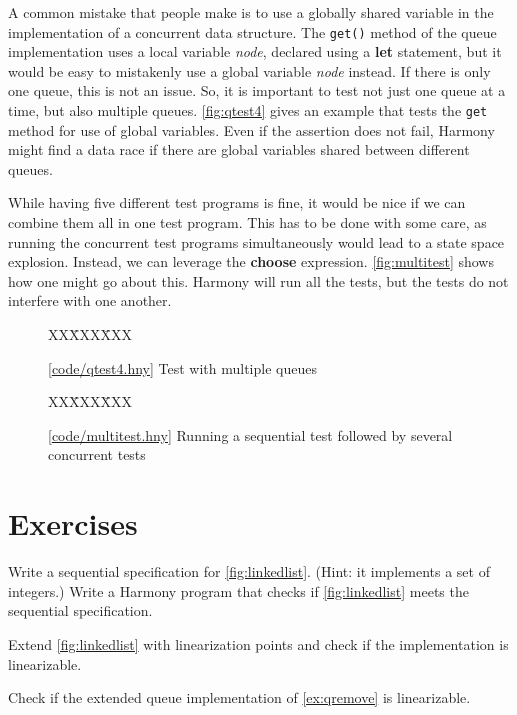 \documentclass{report}
\newcommand{\harmonysource}[1]{
\begin{tabbing}
XX\=XXX\=XXX\kill
    
\end{tabbing}
}
\newcommand{\harmonylink}[1]{%
[\href{https://harmony.cs.cornell.edu/#1}{\underline{#1}}]%
}
\newenvironment{code}{
\tcolorbox
}{
\endtcolorbox
}
\begin{document}
A common mistake that people make is to use
a globally shared variable in the implementation of
a concurrent data structure.
The \texttt{get()} method of the queue implementation
uses a local variable \textit{node}, declared using
a \textbf{let} statement, but it would be easy to
mistakenly use a global variable \textit{node} instead.
If there is only one queue, this is not an issue.
So, it is important to test not just one queue at a
time, but also multiple queues.
\autoref{fig:qtest4} gives an example that
tests the \texttt{get} method for use of global
variables.  Even if the assertion does not fail,
Harmony might find a data race if there are global
variables shared between different queues.

While having five different test programs is fine,
it would be nice if we can combine them all in one
test program.
This has to be done with some care, as running the
concurrent test programs simultaneously would
lead to a state space explosion.
Instead, we can leverage the \textbf{choose}
expression.
\autoref{fig:multitest} shows how one might go
about this.
Harmony will run all the tests, but the
tests do not interfere with one another.

\begin{figure}
\begin{code}
\harmonysource{qtest4}
\end{code}
\caption{\harmonylink{code/qtest4.hny} Test with multiple queues}
\label{fig:qtest4}
\end{figure}

\begin{figure}
\begin{code}
\harmonysource{multitest}
\end{code}
\caption{\harmonylink{code/multitest.hny} Running a
sequential test followed by several concurrent tests}
\label{fig:multitest}
\end{figure}

\section*{Exercises}
\begin{problems}
\item Write a sequential specification for \autoref{fig:linkedlist}.
(Hint: it implements a set of integers.)
Write a Harmony program that checks if \autoref{fig:linkedlist} meets
the sequential specification.
\item Extend \autoref{fig:linkedlist} with linearization points and
check if the implementation is linearizable.
\item Check if the extended queue implementation of \autoref{ex:qremove}
is linearizable.
\end{problems}
\end{document}
